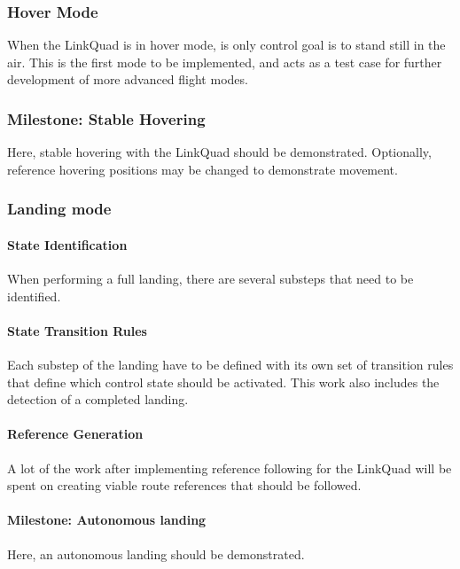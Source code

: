         \subsubsection{Hover Mode}
            When the LinkQuad is in hover mode, is only control goal
            is to stand still in the air. This is the first mode to be
            implemented, and acts as a test case for further development
            of more advanced flight modes.

        \subsubsection{Milestone: Stable Hovering}
            Here, stable hovering with the LinkQuad should be demonstrated.
            Optionally, reference hovering positions may be changed to
            demonstrate movement.

        \subsubsection{Landing mode}
            \paragraph{State Identification \newline}
                When performing a full landing, there are several substeps
                that need to be identified.

            \paragraph{State Transition Rules \newline}
                Each substep of the landing have to be defined with its
                own set of transition rules that define which control
                state should be activated.
                This work also includes the detection of a completed landing.

            \paragraph{Reference Generation \newline}
                A lot of the work after implementing reference following
                for the LinkQuad will be spent on creating viable route
                references that should be followed.

            \paragraph{Milestone: Autonomous landing \newline}
                Here, an autonomous landing should be demonstrated.


